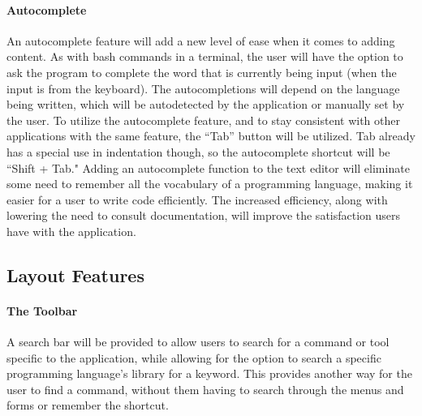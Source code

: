 \documentclass[11pt, oneside]{article}
\begin{document}
\paragraph{Autocomplete}
An autocomplete feature will add a new level of ease when it comes to adding content. As with bash commands in a terminal, the user will have the option to ask the program to complete the word that is currently being input (when the input is from the keyboard). The autocompletions will depend on the language being written, which will be autodetected by the application or manually set by the user. To utilize the autocomplete feature, and to stay consistent with other applications with the same feature, the ``Tab'' button will be utilized. Tab already has a special use in indentation though, so the autocomplete shortcut will be ``Shift + Tab." Adding an autocomplete function to the text editor will eliminate some need to remember all the vocabulary of a programming language, making it easier for a user to write code efficiently. The increased efficiency, along with lowering the need to consult documentation, will improve the satisfaction users have with the application. 

\subsection{Layout Features}
\paragraph{The Toolbar}
A search bar will be provided to allow users to search for a command or tool specific to the application, while allowing for the option to search a specific programming language's library for a keyword. This provides another way for the user to find a command, without them having to search through the menus and forms or remember the shortcut. 
\end{document}
